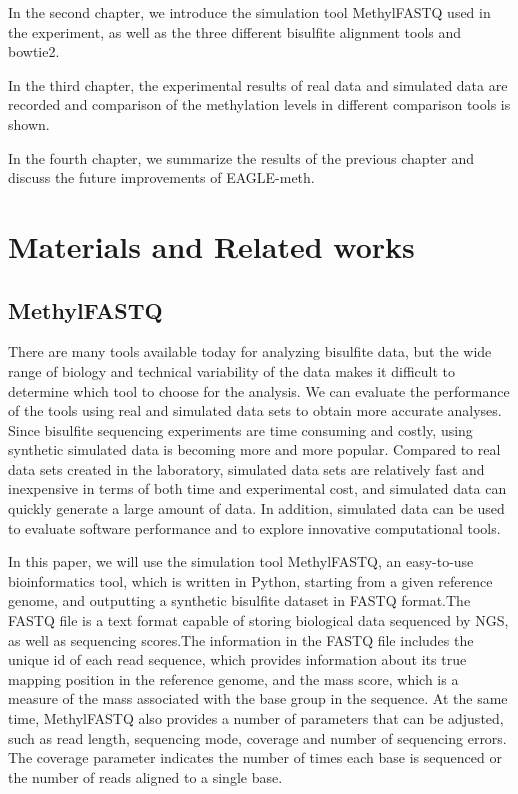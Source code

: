 \documentclass{PHlab-thesis}
\begin{document}
\par 
In the second chapter, we introduce the simulation tool MethylFASTQ used in the experiment, as well as the three different bisulfite alignment tools and bowtie2.

\par
In the third chapter, the experimental results of real data and simulated data are recorded and comparison of the methylation levels in different comparison tools is shown.

\par
In the fourth chapter, we summarize the results of the previous chapter and discuss the future improvements of EAGLE-meth.

\chapter{Materials and Related works}


\section{MethylFASTQ}
There are many tools available today for analyzing bisulfite data, but the wide range of biology and technical variability of the data makes it difficult to determine which tool to choose for the analysis. We can evaluate the performance of the tools using real and simulated data sets to obtain more accurate analyses. Since bisulfite sequencing experiments are time consuming and costly, using synthetic simulated data is becoming more and more popular. Compared to real data sets created in the laboratory, simulated data sets are relatively fast and inexpensive in terms of both time and experimental cost, and simulated data can quickly generate a large amount of data. In addition, simulated data can be used to evaluate software performance and to explore innovative computational tools.

\par
In this paper, we will use the simulation tool MethylFASTQ, an easy-to-use bioinformatics tool, which is written in Python, starting from a given reference genome, and outputting a synthetic bisulfite dataset in FASTQ format.The FASTQ file is a text format capable of storing biological data sequenced by NGS, as well as sequencing scores.The information in the FASTQ file includes the unique id of each read sequence, which provides information about its true mapping position in the reference genome, and the mass score, which is a measure of the mass associated with the base group in the sequence. At the same time, MethylFASTQ also provides a number of parameters that can be adjusted, such as read length, sequencing mode, coverage and number of sequencing errors. The coverage parameter indicates the number of times each base is sequenced or the number of reads aligned to a single base.
\end{document}
